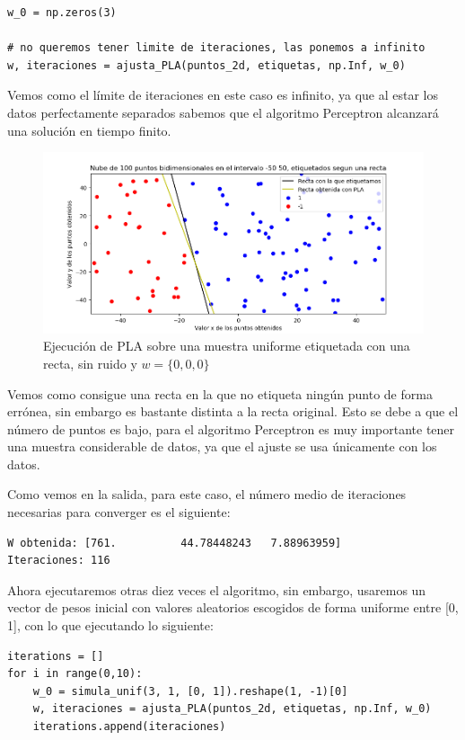 \documentclass[12pt, spanish]{article}
\begin{document}
\begin{lstlisting}
w_0 = np.zeros(3)

# no queremos tener limite de iteraciones, las ponemos a infinito
w, iteraciones = ajusta_PLA(puntos_2d, etiquetas, np.Inf, w_0)
\end{lstlisting}

Vemos como el límite de iteraciones en este caso es infinito, ya que al estar los datos perfectamente separados sabemos que el algoritmo Perceptron alcanzará una solución en tiempo finito.

\begin{figure}[H]
  \centering
      \includegraphics[scale = 0.70]{ej-2-PLA.png}
 		 \caption{Ejecución de PLA sobre una muestra uniforme etiquetada con una recta, sin ruido y $w = \{0, 0, 0\}$}
  		\label{fig:ej2-PLA}

\end{figure}

Vemos como consigue una recta en la que no etiqueta ningún punto de forma errónea, sin embargo es bastante distinta a la recta original. Esto se debe a que el número de puntos es bajo, para el algoritmo Perceptron es muy importante tener una muestra considerable de datos, ya que el ajuste se usa únicamente con los datos.

Como vemos en la salida, para este caso, el número medio de iteraciones necesarias para converger es el siguiente:

\begin{lstlisting}
W obtenida: [761.          44.78448243   7.88963959]
Iteraciones: 116
\end{lstlisting}

Ahora ejecutaremos otras diez veces el algoritmo, sin embargo, usaremos un vector de pesos inicial con valores aleatorios escogidos de forma uniforme entre [0, 1], con lo que ejecutando lo siguiente:

\begin{lstlisting}
iterations = []
for i in range(0,10):
	w_0 = simula_unif(3, 1, [0, 1]).reshape(1, -1)[0]
	w, iteraciones = ajusta_PLA(puntos_2d, etiquetas, np.Inf, w_0)
	iterations.append(iteraciones)
\end{lstlisting}
\end{document}
